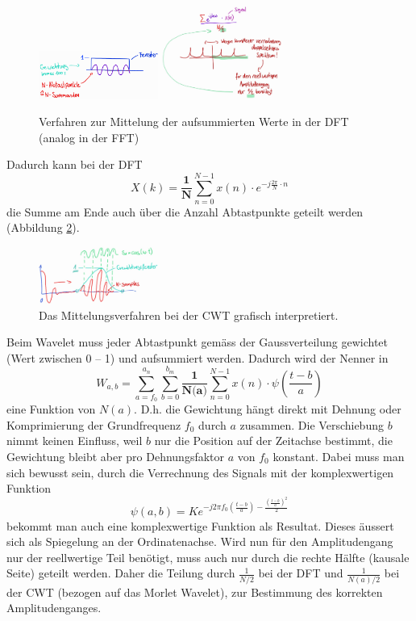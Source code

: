 \begin{figure}
	\centering
	\includegraphics[width=0.35\textwidth]{papers/wavelets/images/11-1_AmpSklal1.png}
	\includegraphics[width=0.35\textwidth]{papers/wavelets/images/11-2_AmpSklal2.png}
	\caption{Verfahren zur Mittelung der aufsummierten Werte in der DFT (analog in der FFT)}
	\label{wavelet:fig:AmpSklal1u2}
\end{figure}

Dadurch kann bei der DFT \[X(k)=\frac{\textbf{1}}{\textbf{N}}\sum_{n=0}^{N-1}x(n)\cdot e^{-j\frac{2\pi}{N}\cdot n}\] die Summe am Ende auch über die Anzahl Abtastpunkte geteilt werden (Abbildung \ref{wavelet:fig:AmpSklal3}).

\begin{figure}
	\centering
	\includegraphics[width=0.35\textwidth]{papers/wavelets/images/11-3_AmpSklal3.png}
	\caption{Das Mittelungsverfahren bei der CWT grafisch interpretiert.}
	\label{wavelet:fig:AmpSklal3}
\end{figure}

Beim Wavelet muss jeder Abtastpunkt gemäss der Gaussverteilung gewichtet (Wert zwischen 0 – 1) und aufsummiert werden. Dadurch wird der Nenner in \[W_{a,b}=\sum_{a=f_0}^{a_n}\sum_{b=0}^{b_m}\frac{\textbf{1}}{\textbf{N(a)}}\sum_{n=0}^{N-1} x(n)\cdot\psi\left(\frac{t-b}{a}\right)\] eine Funktion von $N(a)$. D.h. die Gewichtung hängt direkt mit Dehnung oder Komprimierung der Grundfrequenz $f_0$ durch $a$ zusammen. Die Verschiebung $b$ nimmt keinen Einfluss, weil $b$ nur die Position auf der Zeitachse bestimmt, die Gewichtung bleibt aber pro Dehnungsfaktor $a$ von $f_0$ konstant.
Dabei muss man sich bewusst sein, durch die Verrechnung des Signals mit der komplexwertigen Funktion \[\psi(a,b)=Ke^{-j2\pi f_0\left(\frac{t-b}{a}\right)-\frac{\left(\frac{t-b}{a}\right)^2}{2}}\] bekommt man auch eine komplexwertige Funktion als Resultat. Dieses äussert sich als Spiegelung an der Ordinatenachse. Wird nun für den Amplitudengang nur der reellwertige Teil benötigt, muss auch nur durch die rechte Hälfte (kausale Seite) geteilt werden. Daher die Teilung durch $\frac{1}{N/2}$ bei der DFT und $\frac{1}{N(a)/2}$ bei der CWT (bezogen auf das Morlet Wavelet), zur Bestimmung des korrekten Amplitudenganges.

